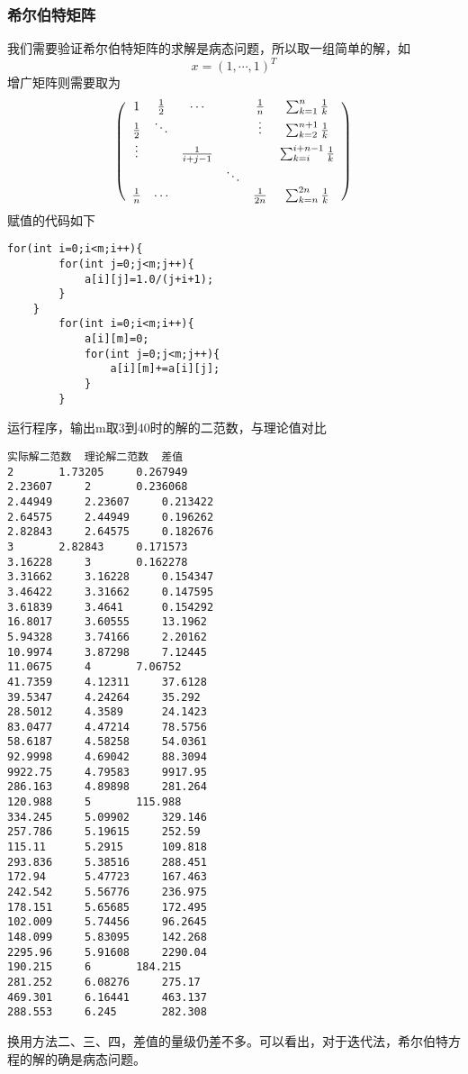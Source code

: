 \documentclass[a4paper,11pt,onecolumn,twoside]{article}
\begin{document}
\subsubsection{希尔伯特矩阵}
我们需要验证希尔伯特矩阵的求解是病态问题，所以取一组简单的解，如$$x=(1, \cdots , 1)^{T}$$
增广矩阵则需要取为
$$
\left( \begin{array} { c c c c c c} { 1 } & { \frac { 1 } { 2 } } & { \cdots } & {}& { \frac { 1 } { n } } & {\sum_{k=1}^{n} \frac{1}{k}} \\ { \frac { 1 } { 2 } } & { \ddots} & { } & { } &{\vdots}&{\sum_{k=2}^{n+1} \frac{1}{k}}\\ { \vdots } & { }  & {\frac{1}{i+j-1} }&{} &{}&{\sum_{k=i}^{i+n-1} \frac{1}{k}}\\ {}&{}&{}&{\ddots}&{}&{} \\{ \frac { 1 } { n } } & { \cdots} &{}&{}& { \frac { 1 } { 2 n } } &{\sum_{k=n}^{2n} \frac{1}{k}}\end{array} \right)
$$
赋值的代码如下
\begin{lstlisting}
for(int i=0;i<m;i++){
        for(int j=0;j<m;j++){
            a[i][j]=1.0/(j+i+1);
        }
    }
        for(int i=0;i<m;i++){
            a[i][m]=0;
            for(int j=0;j<m;j++){
                a[i][m]+=a[i][j];
            }
        }
\end{lstlisting}
运行程序，输出m取3到40时的解的二范数，与理论值对比
\begin{lstlisting}
实际解二范数	理论解二范数	差值
2		1.73205		0.267949
2.23607		2		0.236068
2.44949		2.23607		0.213422
2.64575		2.44949		0.196262
2.82843		2.64575		0.182676
3		2.82843		0.171573
3.16228		3		0.162278
3.31662		3.16228		0.154347
3.46422		3.31662		0.147595
3.61839		3.4641		0.154292
16.8017		3.60555		13.1962
5.94328		3.74166		2.20162
10.9974		3.87298		7.12445
11.0675		4		7.06752
41.7359		4.12311		37.6128
39.5347		4.24264		35.292
28.5012		4.3589		24.1423
83.0477		4.47214		78.5756
58.6187		4.58258		54.0361
92.9998		4.69042		88.3094
9922.75		4.79583		9917.95
286.163		4.89898		281.264
120.988		5		115.988
334.245		5.09902		329.146
257.786		5.19615		252.59
115.11		5.2915		109.818
293.836		5.38516		288.451
172.94		5.47723		167.463
242.542		5.56776		236.975
178.151		5.65685		172.495
102.009		5.74456		96.2645
148.099		5.83095		142.268
2295.96		5.91608		2290.04
190.215		6		184.215
281.252		6.08276		275.17
469.301		6.16441		463.137
288.553		6.245		282.308

\end{lstlisting}
换用方法二、三、四，差值的量级仍差不多。可以看出，对于迭代法，希尔伯特方程的解的确是病态问题。
\end{document}
